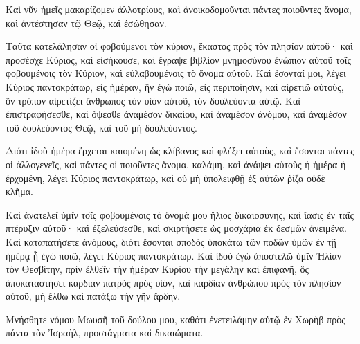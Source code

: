 {Καὶ νῦν ἡμεῖς μακαρίζομεν ἀλλοτρίους, καὶ ἀνοικοδομοῦνται πάντες ποιοῦντες ἄνομα, καὶ ἀντέστησαν τῷ Θεῷ, καὶ ἐσώθησαν.
\par }{\PP {}Ταῦτα κατελάλησαν οἱ φοβούμενοι τὸν κύριον, ἕκαστος πρὸς τὸν πλησίον αὐτοῦ· καὶ προσέσχε Κύριος, καὶ εἰσήκουσε, καὶ ἔγραψε βιβλίον μνημοσύνου ἐνώπιον αὐτοῦ τοῖς φοβουμένοις τὸν Κύριον, καὶ εὐλαβουμένοις τὸ ὄνομα αὐτοῦ.
Καὶ ἔσονταί μοι, λέγει Κύριος παντοκράτωρ, εἰς ἡμέραν, ἣν ἐγὼ ποιῶ, εἰς περιποίησιν, καὶ αἱρετιῶ αὐτοὺς, ὃν τρόπον αἱρετίζει ἄνθρωπος τὸν υἱὸν αὐτοῦ, τὸν δουλεύοντα αὐτῷ.
Καὶ ἐπιστραφήσεσθε, καὶ ὄψεσθε ἀναμέσον δικαίου, καὶ ἀναμέσον ἀνόμου, καὶ ἀναμέσον τοῦ δουλεύοντος Θεῷ, καὶ τοῦ μὴ δουλεύοντος.
\par }{\PP {}Διότι ἰδοὺ ἡμέρα ἔρχεται καιομένη ὡς κλίβανος καὶ φλέξει αὐτοὺς, καὶ ἔσονται πάντες οἱ ἀλλογενεῖς, καὶ πάντες οἱ ποιοῦντες ἄνομα, καλάμη, καὶ ἀνάψει αὐτοὺς ἡ ἡμέρα ἡ ἐρχομένη, λέγει Κύριος παντοκράτωρ, καὶ οὐ μὴ ὑπολειφθῇ ἐξ αὐτῶν ῥίζα οὐδὲ κλῆμα.
\par }{\PP {}Καὶ ἀνατελεῖ ὑμῖν τοῖς φοβουμένοις τὸ ὄνομά μου ἥλιος δικαιοσύνης, καὶ ἴασις ἐν ταῖς πτέρυξιν αὐτοῦ· καὶ ἐξελεύσεσθε, καὶ σκιρτήσετε ὡς μοσχάρια ἐκ δεσμῶν ἀνειμένα.
Καὶ καταπατήσετε ἀνόμους, διότι ἔσονται σποδὸς ὑποκάτω τῶν ποδῶν ὑμῶν ἐν τῇ ἡμέρᾳ ᾗ ἐγὼ ποιῶ, λέγει Κύριος παντοκράτωρ.
Καὶ ἰδοὺ ἐγὼ ἀποστελῶ ὑμῖν Ἠλίαν τὸν Θεσβίτην, πρὶν ἐλθεῖν τὴν ἡμέραν Κυρίου τὴν μεγάλην καὶ ἐπιφανῆ,
ὃς ἀποκαταστήσει καρδίαν πατρὸς πρὸς υἱὸν, καὶ καρδίαν ἀνθρώπου πρὸς τὸν πλησίον αὐτοῦ, μὴ ἔλθω καὶ πατάξω τὴν γῆν ἄρδην.
\par }{\PP {}Μνήσθητε νόμου Μωυσῆ τοῦ δούλου μου, καθότι ἐνετειλάμην αὐτῷ ἐν Χωρὴβ πρὸς πάντα τὸν Ἰσραὴλ, προστάγματα καὶ δικαιώματα.
\par }